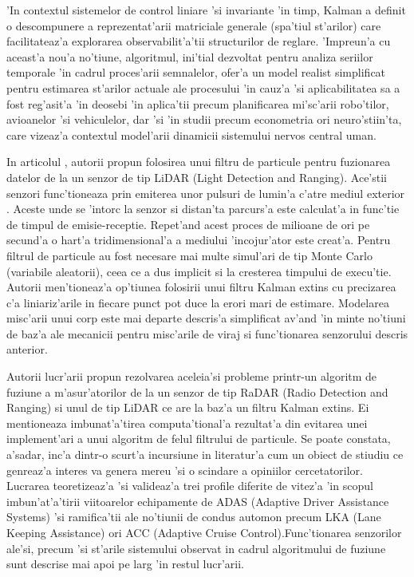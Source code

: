\documentclass[12pt,a4paper,twoside]{report}
\begin{document}
\vspace{5px}

'In contextul sistemelor de control liniare 'si invariante 'in timp, Kalman a definit o descompunere a reprezentat'arii matriciale generale (spa'tiul st'arilor) care facilitateaz'a explorarea observabilit'a'tii structurilor de reglare. 'Impreun'a cu aceast'a nou'a no'tiune, algoritmul, ini'tial dezvoltat pentru analiza seriilor temporale 'in cadrul proces'arii semnalelor, ofer'a un model realist simplificat pentru estimarea st'arilor actuale ale procesului 'in cauz'a 'si aplicabilitatea sa a fost reg'asit'a 'in deosebi 'in aplica'tii precum planificarea mi'sc'arii robo'tilor, avioanelor 'si vehiculelor, dar 'si 'in studii precum econometria ori neuro'stiin'ta, care vizeaz'a contextul model'arii dinamicii sistemului nervos central uman.

\vspace{5px}

In articolul \cite{5164334}, autorii propun folosirea unui filtru de particule pentru fuzionarea datelor de la un senzor de tip LiDAR (Light Detection and Ranging). Ace'stii senzori func'tioneaza prin emiterea unor pulsuri de lumin'a c'atre mediul exterior \cite{9127855}. Aceste unde se 'intorc la senzor si distan'ta parcurs'a este calculat'a in func'tie de timpul de emisie-receptie. Repet'and acest proces de milioane de ori pe secund'a o hart'a tridimensional'a a mediului 'incojur'ator este creat'a. Pentru filtrul de particule au fost necesare mai multe simul'ari de tip Monte Carlo (variabile aleatorii), ceea ce a dus implicit si la cresterea timpului de execu'tie. Autorii men'tioneaz'a op'tiunea folosirii unui filtru Kalman extins cu precizarea c'a liniariz'arile in fiecare punct pot duce la erori mari de estimare. Modelarea misc'arii unui corp este mai departe descris'a simplificat av'and 'in minte no'tiuni de baz'a ale mecanicii pentru misc'arile de viraj si func'tionarea senzorului descris anterior. 

\vspace{5px}

Autorii lucr'arii \cite{LEE2019130} propun rezolvarea aceleia'si probleme printr-un algoritm de fuziune a m'asur'atorilor de la un senzor de tip RaDAR (Radio Detection and Ranging) si unul de tip LiDAR ce are la baz'a un filtru Kalman extins. Ei mentioneaza imbunat'a'tirea computa'tional'a rezultat'a din evitarea unei implement'ari a unui algoritm de felul filtrului de particule. Se poate constata, a'sadar, inc'a dintr-o scurt'a incursiune in literatur'a cum un obiect de stiudiu ce genreaz'a interes va genera mereu 'si o scindare a opiniilor cercetatorilor. Lucrarea teoretizeaz'a 'si valideaz'a trei profile diferite de vitez'a 'in scopul imbun'at'a'tirii viitoarelor echipamente de ADAS (Adaptive Driver Assistance Systems) 'si ramifica'tii ale no'tiunii de condus automon precum LKA (Lane Keeping Assistance) ori ACC (Adaptive Cruise Control).Func'tionarea senzorilor ale'si, precum 'si st'arile sistemului observat in cadrul algoritmului de fuziune sunt descrise mai apoi pe larg 'in restul lucr'arii.
\end{document}
